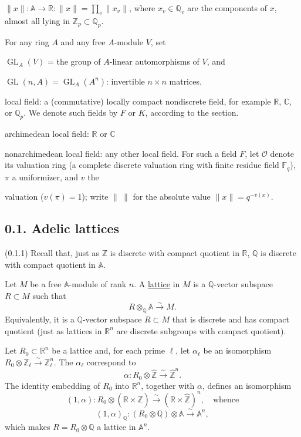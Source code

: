 \documentclass[10pt,a4paper]{article}
\providecommand{\GL}{\operatorname{GL}}
\providecommand{\R}{\mathbb R}
\providecommand{\Q}{\mathbb Q}
\providecommand{\Z}{\mathbb Z}
\providecommand{\C}{\mathbb C}
\providecommand{\A}{\mathbb A}
\begin{document}
\noindent $\|x\|:\A\longrightarrow\R:\|x\|=\prod_v\|x_v\|$, where $x_v\in\Q_v$ are the components of $x$, almost all lying in $\Z_p\subset\Q_p$.

For any ring $A$ and any free $A$-module $V$, set

\noindent $\GL_A(V)$ = the group of $A$-linear automorphisms of $V$, and

\noindent $\GL(n,A)=\GL_A(A^n)$: invertible $n\times n$ matrices.

\noindent local field: a (commutative) locally compact nondiscrete field, for example $\R$, $\C$, or $\Q_p$. We denote such fields by $F$ or $K$, according to the section.

\noindent archimedean local field: $\R$ or $\C$

\noindent nonarchimedean local field: any other local field. For such a field $F$, let $\mathcal O$ denote its valuation ring (a complete discrete valuation ring with finite residue field $\mathbb F_q$), $\pi$ a uniformizer, and $v$ the

\clearpage
{}
\hypertarget{authority-5}{}
valuation ($v(\pi)=1$); write $\|\ \|$ for the absolute value $\|x\|=q^{-v(x)}$.

\subsection*{0.1. Adelic lattices}
(0.1.1) Recall that, just as $\Z$ is discrete with compact quotient in $\R$, $\Q$ is discrete with compact quotient in $\A$.

Let $M$ be a free $\A$-module of rank $n$. A \underline{lattice} in $M$ is a $\Q$-vector subspace $R\subset M$ such that
\[
R\otimes_{\Q}\A\xrightarrow{\sim}M.
\]
Equivalently, it is a $\Q$-vector subspace $R\subset M$ that is discrete and has compact quotient (just as lattices in $\R^n$ are discrete subgroups with compact quotient).

Let $R_0\subset\R^n$ be a lattice and, for each prime $\ell$, let $\alpha_\ell$ be an isomorphism $R_0\otimes\Z_\ell\xrightarrow{\sim}\Z_\ell^n$. The $\alpha_\ell$ correspond to
\[
\alpha:R_0\otimes\widehat{\Z}\xrightarrow{\sim}\widehat{\Z}^{n}.
\]
The identity embedding of $R_0$ into $\R^n$, together with $\alpha$, defines an isomorphism
\[
(1,\alpha):R_0\otimes(\R\times\widehat{\Z})\xrightarrow{\sim}(\R\times\widehat{\Z})^n,\quad\text{whence}
\]
\[
(1,\alpha)_{\Q}:(R_0\otimes\Q)\otimes\A\xrightarrow{\sim}\A^n,
\]
which makes $R=R_0\otimes\Q$ a lattice in $\A^n$.
\end{document}
